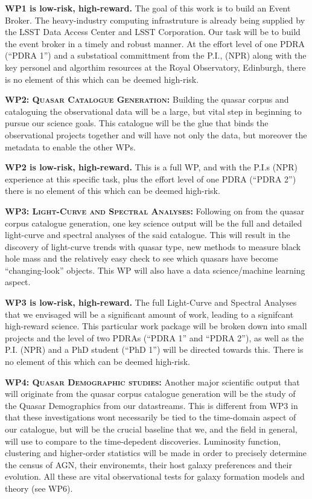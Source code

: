 \documentclass[oneside, a4paper, onecolumn, 11pt]{article}
\begin{document}
\noindent
{\bf WP1 is low-risk, high-reward.} 
The goal of this work is to build an  Event Broker. 
The heavy-industry computing
infrastruture is already being supplied by the LSST Data Access Center
and LSST Corporation. Our task will be to build the event broker in a
timely and robust manner. At the effort level of one PDRA (``PDRA 1'')
and a substatioal committment from the P.I., (NPR) along with the key
personel and algorthim resources at the Royal Observatory, Edinburgh,
there is no element of this which can be deemed high-risk.


\smallskip
\smallskip
\noindent
\textbf{\textsc{WP2: Quasar Catalogue Generation:}} 
Building the quasar corpus and cataloguing the observational data will
be a large, but vital step in beginning to pursue our science
goals. This catalogue will be the glue that binds the observational
projects together and will have not only the data, but moreover the
metadata to enable the other WPs.

\noindent
{\bf WP2 is low-risk, high-reward.}
This is a full WP, and with the P.I.s (NPR) experience at this
specific task, plus the effort level of one PDRA (``PDRA 2'') there is
no element of this which can be deemed high-risk.


\smallskip
\smallskip
\noindent
\textbf{\textsc{WP3: Light-Curve and Spectral Analyses:}} 
Following on from the quasar corpus catalogue generation, one key
science output will be the full and detailed light-curve and spectral
analyses of the said catalogue. This will result in the discovery of
light-curve trends with quasar type, new methods to measure black hole
mass and the relatively easy check to see which quasars have become
``changing-look'' objects. This WP will also have a data science/machine learning 
aspect.

\noindent
{\bf WP3 is low-risk, high-reward.} The full Light-Curve and Spectral
Analyses that we envisaged will be a significant amount of work,
leading to a signifcant high-reward science. This particular work
package will be broken down into small projects and the level of two
PDRAs (``PDRA 1'' and ``PDRA 2''), as well as the P.I. (NPR) and a PhD
student (``PhD 1'') will be directed towards this. There is no element
of this which can be deemed high-risk.


\smallskip
\smallskip
\noindent
\textbf{\textsc{WP4: Quasar Demographic studies:}} 
Another major scientific output that will originate from the quasar
corpus catalogue generation will be the study of the Quasar
Demographics from our datastreams. This is different from WP3 in that
these investigations wont necessarily be tied to the time-domain
aspect of our catalogue, but will be the crucial baseline that we, and
the field in general, will use to compare to the time-depedent
discoveries. Luminosity function, clustering and higher-order
statistics will be made in order to precisely determine the census of
AGN, their environemts, their host galaxy preferences and their
evolution. All these are vital observational tests for galaxy
formation models and theory (see WP6).
\end{document}
